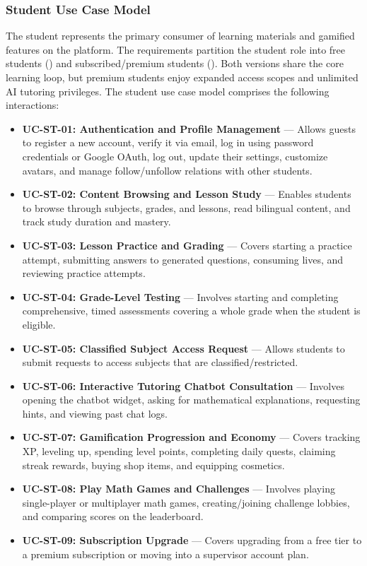 \subsubsection{Student Use Case Model}

The student represents the primary consumer of learning materials and gamified features on the platform. The requirements partition the student role into free students () and subscribed/premium students (). Both versions share the core learning loop, but premium students enjoy expanded access scopes and unlimited AI tutoring privileges. The student use case model comprises the following interactions:
\begin{itemize}
  \item \textbf{UC-ST-01: Authentication and Profile Management} --- Allows guests to register a new account, verify it via email, log in using password credentials or Google OAuth, log out, update their settings, customize avatars, and manage follow/unfollow relations with other students.
  \item \textbf{UC-ST-02: Content Browsing and Lesson Study} --- Enables students to browse through subjects, grades, and lessons, read bilingual content, and track study duration and mastery.
  \item \textbf{UC-ST-03: Lesson Practice and Grading} --- Covers starting a practice attempt, submitting answers to generated questions, consuming lives, and reviewing practice attempts.
  \item \textbf{UC-ST-04: Grade-Level Testing} --- Involves starting and completing comprehensive, timed assessments covering a whole grade when the student is eligible.
  \item \textbf{UC-ST-05: Classified Subject Access Request} --- Allows students to submit requests to access subjects that are classified/restricted.
  \item \textbf{UC-ST-06: Interactive Tutoring Chatbot Consultation} --- Involves opening the chatbot widget, asking for mathematical explanations, requesting hints, and viewing past chat logs.
  \item \textbf{UC-ST-07: Gamification Progression and Economy} --- Covers tracking XP, leveling up, spending level points, completing daily quests, claiming streak rewards, buying shop items, and equipping cosmetics.
  \item \textbf{UC-ST-08: Play Math Games and Challenges} --- Involves playing single-player or multiplayer math games, creating/joining challenge lobbies, and comparing scores on the leaderboard.
  \item \textbf{UC-ST-09: Subscription Upgrade} --- Covers upgrading from a free tier to a premium subscription or moving into a supervisor account plan.
\end{itemize}

